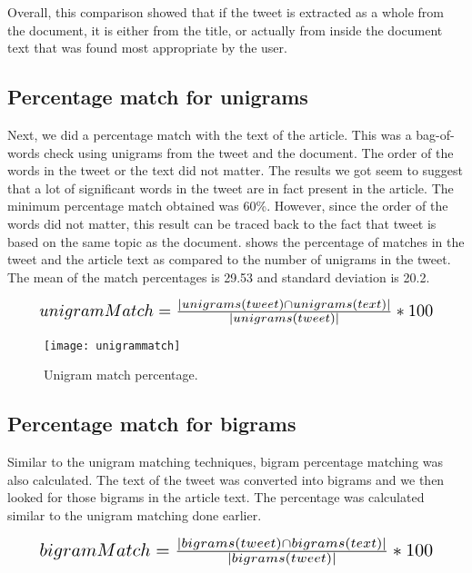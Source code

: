Overall, this comparison showed that if the tweet is extracted as a whole from the document, it is either from the title, or actually from inside the document text that was found most appropriate by the user. 

\subsection{Percentage match for unigrams}

Next, we did a percentage match with the text of the article. This was a bag-of-words check using unigrams from the tweet and the document. The order of the words in the tweet or the text did not matter. The results we got seem to suggest that a lot of significant words in the tweet are in fact present in the article. The minimum percentage match obtained was 60\%. However, since the order of the words did not matter, this result can  be traced back to the fact that tweet is based on the same topic as the document.  shows the percentage of matches in the tweet and the article text as compared to the number of unigrams in the tweet. The mean of the match percentages is 29.53 and standard deviation is 20.2. 

\begin{equation}
\resizebox{.9\hsize}{!}{$unigramMatch = \frac{| unigrams(tweet) \cap unigrams(text) |}{| unigrams(tweet) |} * 100$}
\end{equation}

\begin{figure}[htbp]
\centering
\texttt{[image: unigrammatch]}
\caption{Unigram match percentage.}
\label{fig:unigrammatch}
\end{figure}

\subsection{Percentage match for bigrams}

Similar to the unigram matching techniques, bigram percentage matching was also calculated. The text of the tweet was converted into bigrams and we then looked for those bigrams in the article text. The percentage was calculated similar to the unigram matching done earlier. 

\begin{equation}
\resizebox{.9\hsize}{!}{$bigramMatch = \frac{| bigrams(tweet) \cap bigrams(text) |}{| bigrams(tweet) |} * 100$}
\end{equation}

